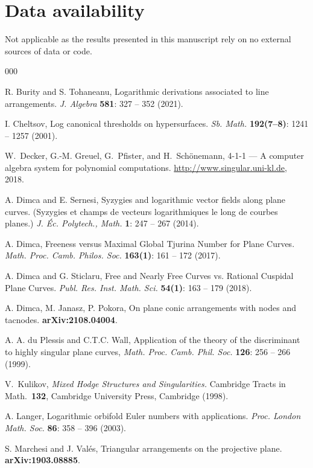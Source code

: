 \documentclass[12pt]{amsart}
\theoremstyle{plain}
\theoremstyle{definition}
\numberwithin{equation}{section}
\begin{document}
\section*{Data availability} Not applicable as the results presented in this manuscript rely on no external sources of data or code.
\begin{thebibliography}{000}

 R. Burity and S. Tohaneanu, Logarithmic derivations associated to line arrangements. \textit{J. Algebra} \textbf{581}: 327 -- 352 (2021).

I. Cheltsov, Log canonical thresholds on hypersurfaces. \textit{Sb. Math.} \textbf{192(7–8)}: 1241 -- 1257 (2001).

W.~Decker, G.-M. Greuel, G.~Pfister, and H.~Sch\"onemann,
 {4-1-1} --- {A} computer algebra system for polynomial computations. \newblock \url{http://www.singular.uni-kl.de}, 2018.

A. Dimca and E. Sernesi, Syzygies and logarithmic vector fields along plane curves. (Syzygies et champs de vecteurs logarithmiques le long de courbes planes.) \textit{J. Éc. Polytech., Math.} \textbf{1}:  247 -- 267 (2014).

A. Dimca, Freeness versus Maximal Global Tjurina Number for Plane Curves. \textit{Math. Proc. Camb. Philos. Soc.} \textbf{163(1)}: 161 -- 172 (2017).

A. Dimca and G. Sticlaru, Free and Nearly Free Curves vs. Rational Cuspidal Plane Curves. \textit{Publ. Res. Inst. Math. Sci.} \textbf{54(1)}: 163 -- 179 (2018). 

A. Dimca, M. Janasz, P. Pokora, On plane conic arrangements with nodes and tacnodes. \textbf{arXiv:2108.04004}.

A. A. du Plessis and  C.T.C. Wall, Application of the theory of the discriminant to highly singular plane curves, \textit{Math. Proc. Camb. Phil. Soc.} \textbf{126}: 256 -- 266 (1999).

V.\ Kulikov,  {\it Mixed Hodge Structures and Singularities.}
Cambridge Tracts in Math.\ \textbf{132}, Cambridge University Press, Cambridge (1998).

A. Langer, Logarithmic orbifold Euler numbers with applications. \textit{Proc. London Math. Soc.} \textbf{86}: 358 -- 396 (2003).

S. Marchesi and J. Val\'es, Triangular arrangements on the projective plane. \textbf{arXiv:1903.08885}.


\end{thebibliography}
\end{document}
